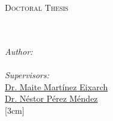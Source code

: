 \documentclass[
11pt, %
english, %
singlespacing, %
headsepline, %
]{MastersDoctoralThesis} %
\author{Sebastián Echeverría Progulakis} %
\newcommand{\supervisorone}{Dr. Maite Martínez Eixarch}  %
\newcommand{\supervisortwo}{Dr. Néstor Pérez Méndez}  %
\begin{document}
\frontmatter %

\pagestyle{plain} %


\begin{titlepage}
\begin{center}

\vspace*{.06\textheight}
{\scshape\LARGE \univname\par}\vspace{1.5cm} %
\textsc{\Large Doctoral Thesis}\\[0.5cm] %

\HRule \\[0.4cm] %
{\huge \bfseries \ttitle\par}\vspace{0.4cm} %
\HRule \\[1.5cm] %
 
{\large
\emph{Author:}\\
\href{https://orcid.org/0000-0003-0592-9436}{\authorname}\\} %
\vspace*{.03\textheight}
{\large
\emph{Supervisors:} \\
\href{https://orcid.org/0000-0002-7352-8522}{\supervisorone}\\
\href{https://orcid.org/0000-0001-6264-2920}{\supervisortwo}}\\ %
[3cm]
 

\end{center}
\end{titlepage}
\end{document}

